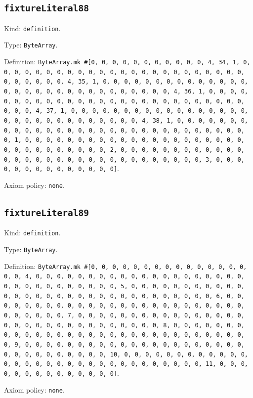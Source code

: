 \documentclass[11pt]{article}
\begin{document}
\subsection*{\texttt{fixtureLiteral88}}
\noindent Kind: \texttt{definition}.\par
\noindent Type: \texttt{ByteArray}.\par
\noindent Definition: \texttt{ByteArray.mk \#[0, 0, 0, 0, 0, 0, 0, 0, 0, 0, 0, 4, 34, 1, 0, 0, 0, 0, 0, 0, 0, 0, 0, 0, 0, 0, 0, 0, 0, 0, 0, 0, 0, 0, 0, 0, 0, 0, 0, 0, 0, 0, 0, 0, 4, 35, 1, 0, 0, 0, 0, 0, 0, 0, 0, 0, 0, 0, 0, 0, 0, 0, 0, 0, 0, 0, 0, 0, 0, 0, 0, 0, 0, 0, 0, 0, 0, 4, 36, 1, 0, 0, 0, 0, 0, 0, 0, 0, 0, 0, 0, 0, 0, 0, 0, 0, 0, 0, 0, 0, 0, 0, 0, 0, 0, 0, 0, 0, 0, 0, 4, 37, 1, 0, 0, 0, 0, 0, 0, 0, 0, 0, 0, 0, 0, 0, 0, 0, 0, 0, 0, 0, 0, 0, 0, 0, 0, 0, 0, 0, 0, 0, 0, 4, 38, 1, 0, 0, 0, 0, 0, 0, 0, 0, 0, 0, 0, 0, 0, 0, 0, 0, 0, 0, 0, 0, 0, 0, 0, 0, 0, 0, 0, 0, 0, 0, 0, 1, 0, 0, 0, 0, 0, 0, 0, 0, 0, 0, 0, 0, 0, 0, 0, 0, 0, 0, 0, 0, 0, 0, 0, 0, 0, 0, 0, 0, 0, 0, 0, 2, 0, 0, 0, 0, 0, 0, 0, 0, 0, 0, 0, 0, 0, 0, 0, 0, 0, 0, 0, 0, 0, 0, 0, 0, 0, 0, 0, 0, 0, 0, 0, 3, 0, 0, 0, 0, 0, 0, 0, 0, 0, 0, 0, 0, 0, 0]}.\par
\noindent Axiom policy: \texttt{none}.\par
\subsection*{\texttt{fixtureLiteral89}}
\noindent Kind: \texttt{definition}.\par
\noindent Type: \texttt{ByteArray}.\par
\noindent Definition: \texttt{ByteArray.mk \#[0, 0, 0, 0, 0, 0, 0, 0, 0, 0, 0, 0, 0, 0, 0, 0, 0, 4, 0, 0, 0, 0, 0, 0, 0, 0, 0, 0, 0, 0, 0, 0, 0, 0, 0, 0, 0, 0, 0, 0, 0, 0, 0, 0, 0, 0, 0, 0, 0, 5, 0, 0, 0, 0, 0, 0, 0, 0, 0, 0, 0, 0, 0, 0, 0, 0, 0, 0, 0, 0, 0, 0, 0, 0, 0, 0, 0, 0, 0, 0, 0, 6, 0, 0, 0, 0, 0, 0, 0, 0, 0, 0, 0, 0, 0, 0, 0, 0, 0, 0, 0, 0, 0, 0, 0, 0, 0, 0, 0, 0, 0, 0, 0, 7, 0, 0, 0, 0, 0, 0, 0, 0, 0, 0, 0, 0, 0, 0, 0, 0, 0, 0, 0, 0, 0, 0, 0, 0, 0, 0, 0, 0, 0, 0, 0, 8, 0, 0, 0, 0, 0, 0, 0, 0, 0, 0, 0, 0, 0, 0, 0, 0, 0, 0, 0, 0, 0, 0, 0, 0, 0, 0, 0, 0, 0, 0, 0, 9, 0, 0, 0, 0, 0, 0, 0, 0, 0, 0, 0, 0, 0, 0, 0, 0, 0, 0, 0, 0, 0, 0, 0, 0, 0, 0, 0, 0, 0, 0, 0, 10, 0, 0, 0, 0, 0, 0, 0, 0, 0, 0, 0, 0, 0, 0, 0, 0, 0, 0, 0, 0, 0, 0, 0, 0, 0, 0, 0, 0, 0, 0, 0, 11, 0, 0, 0, 0, 0, 0, 0, 0, 0, 0, 0, 0, 0, 0]}.\par
\noindent Axiom policy: \texttt{none}.\par
\end{document}
